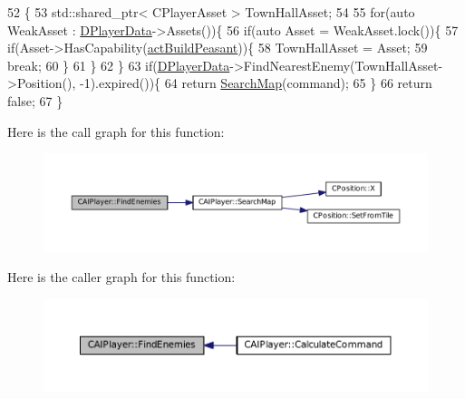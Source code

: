 \begin{DoxyCode}
52                                                          \{
53     std::shared\_ptr< CPlayerAsset > TownHallAsset;
54     
55     \textcolor{keywordflow}{for}(\textcolor{keyword}{auto} WeakAsset : \hyperlink{classCAIPlayer_a83b5113c8f7e80df54940b647c5ee2e6}{DPlayerData}->Assets())\{
56         \textcolor{keywordflow}{if}(\textcolor{keyword}{auto} Asset = WeakAsset.lock())\{
57             \textcolor{keywordflow}{if}(Asset->HasCapability(\hyperlink{GameDataTypes_8h_a35b98ce26aca678b03c6f9f76e4778cea66c601dce0fc095460b3c2c25f66ee71}{actBuildPeasant}))\{
58                 TownHallAsset = Asset;
59                 \textcolor{keywordflow}{break};
60             \}
61         \}
62     \}
63     \textcolor{keywordflow}{if}(\hyperlink{classCAIPlayer_a83b5113c8f7e80df54940b647c5ee2e6}{DPlayerData}->FindNearestEnemy(TownHallAsset->Position(), -1).expired())\{
64         \textcolor{keywordflow}{return} \hyperlink{classCAIPlayer_afafbe8fc589e09a16ae1f02f2794d7b0}{SearchMap}(command);
65     \}
66     \textcolor{keywordflow}{return} \textcolor{keyword}{false};    
67 \}
\end{DoxyCode}
Here is the call graph for this function\+:\nopagebreak
\begin{figure}[H]
\begin{center}
\leavevmode
\includegraphics[width=350pt]{classCAIPlayer_a33b1533570e7a00114d1b85b3551e395_cgraph}
\end{center}
\end{figure}
Here is the caller graph for this function\+:\nopagebreak
\begin{figure}[H]
\begin{center}
\leavevmode
\includegraphics[width=350pt]{classCAIPlayer_a33b1533570e7a00114d1b85b3551e395_icgraph}
\end{center}
\end{figure}
\hypertarget{classCAIPlayer_afafbe8fc589e09a16ae1f02f2794d7b0}{}\label{classCAIPlayer_afafbe8fc589e09a16ae1f02f2794d7b0} 
